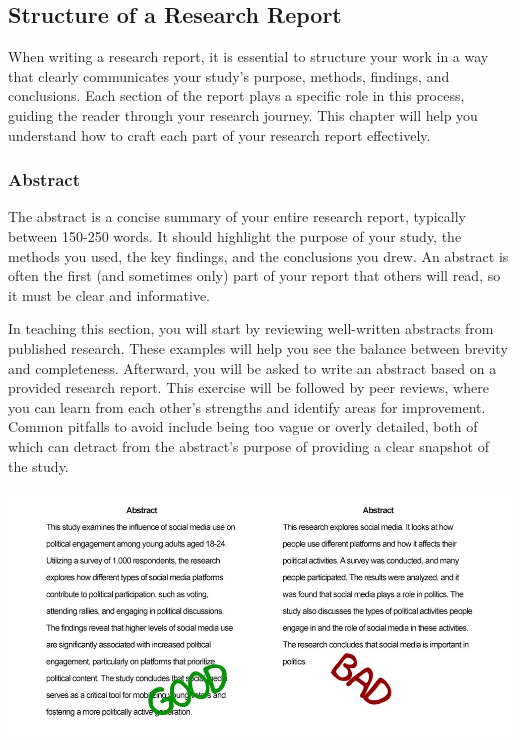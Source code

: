 \documentclass[
]{book}
\begin{document}
\subsection{Structure of a Research Report}\label{structure-of-a-research-report}

When writing a research report, it is essential to structure your work in a way that clearly communicates your study's purpose, methods, findings, and conclusions. Each section of the report plays a specific role in this process, guiding the reader through your research journey. This chapter will help you understand how to craft each part of your research report effectively.

\subsubsection{Abstract}\label{abstract}

The abstract is a concise summary of your entire research report, typically between 150-250 words. It should highlight the purpose of your study, the methods you used, the key findings, and the conclusions you drew. An abstract is often the first (and sometimes only) part of your report that others will read, so it must be clear and informative.

In teaching this section, you will start by reviewing well-written abstracts from published research. These examples will help you see the balance between brevity and completeness. Afterward, you will be asked to write an abstract based on a provided research report. This exercise will be followed by peer reviews, where you can learn from each other's strengths and identify areas for improvement. Common pitfalls to avoid include being too vague or overly detailed, both of which can detract from the abstract's purpose of providing a clear snapshot of the study.

\includegraphics[width=1\textwidth,height=\textheight]{images/fig081.jpg}
\end{document}
